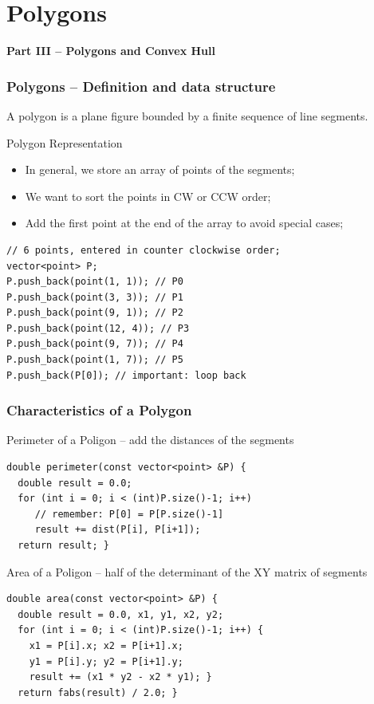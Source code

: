 \section{Polygons}

\begin{frame}
  \centering
  {\bf Part III -- Polygons and Convex Hull}

\end{frame}

\begin{frame}[fragile]
  \frametitle{Polygons -- Definition and data structure}

    A polygon is a plane figure bounded by a finite sequence of line
    segments.

  \begin{exampleblock}{Polygon Representation}
    \begin{itemize}
    \item In general, we store an array of points of the segments;
    \item We want to sort the points in CW or CCW order;
    \item Add the first point at the end of the array to avoid
      special cases;
    \end{itemize}
{\smaller
\begin{verbatim}
// 6 points, entered in counter clockwise order;
vector<point> P;
P.push_back(point(1, 1)); // P0
P.push_back(point(3, 3)); // P1
P.push_back(point(9, 1)); // P2
P.push_back(point(12, 4)); // P3
P.push_back(point(9, 7)); // P4
P.push_back(point(1, 7)); // P5
P.push_back(P[0]); // important: loop back
\end{verbatim}}
\end{exampleblock}
\end{frame}

\begin{frame}[fragile]
  \frametitle{Characteristics of a Polygon}
  {\smaller
    \begin{exampleblock}{Perimeter of a Poligon -- add the distances of the segments}
\begin{verbatim}
double perimeter(const vector<point> &P) {
  double result = 0.0;
  for (int i = 0; i < (int)P.size()-1; i++)
     // remember: P[0] = P[P.size()-1]
     result += dist(P[i], P[i+1]);
  return result; }
\end{verbatim}
    \end{exampleblock}

    \begin{exampleblock}{Area of a Poligon -- half of the determinant of the XY matrix of segments}
\begin{verbatim}
double area(const vector<point> &P) {
  double result = 0.0, x1, y1, x2, y2;
  for (int i = 0; i < (int)P.size()-1; i++) {
    x1 = P[i].x; x2 = P[i+1].x;
    y1 = P[i].y; y2 = P[i+1].y;
    result += (x1 * y2 - x2 * y1); }
  return fabs(result) / 2.0; }
\end{verbatim}
    \end{exampleblock}
}
\end{frame}


